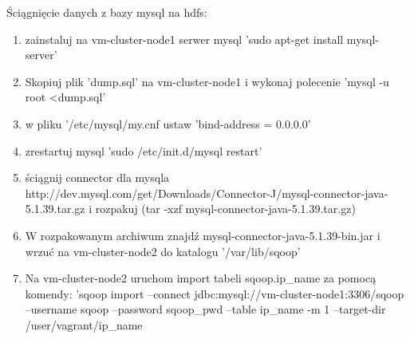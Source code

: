 \documentclass[11pt]{article}
\begin{document}
Ściągnięcie danych z bazy mysql na hdfs:
\begin{enumerate}
\item zainstaluj na vm-cluster-node1 serwer mysql 'sudo apt-get install mysql-server'
\item Skopiuj plik 'dump.sql' na vm-cluster-node1 i wykonaj polecenie 'mysql -u root \textless dump.sql'
\item w pliku '/etc/mysql/my.cnf ustaw 'bind-address = 0.0.0.0'
\item zrestartuj mysql 'sudo /etc/init.d/mysql restart'
\item ściągnij connector dla mysqla http://dev.mysql.com/get/Downloads/Connector-J/mysql-connector-java-5.1.39.tar.gz i rozpakuj (tar -xzf mysql-connector-java-5.1.39.tar.gz)
\item W rozpakowanym archiwum znajdź mysql-connector-java-5.1.39-bin.jar i wrzuć na vm-cluster-node2 do katalogu '/var/lib/sqoop'
\item Na vm-cluster-node2 uruchom import tabeli sqoop.ip\_name za pomocą komendy: 'sqoop import --connect jdbc:mysql://vm-cluster-node1:3306/sqoop --username sqoop --password sqoop\_pwd --table ip\_name -m 1 --target-dir /user/vagrant/ip\_name
\end{enumerate}
\end{document}
